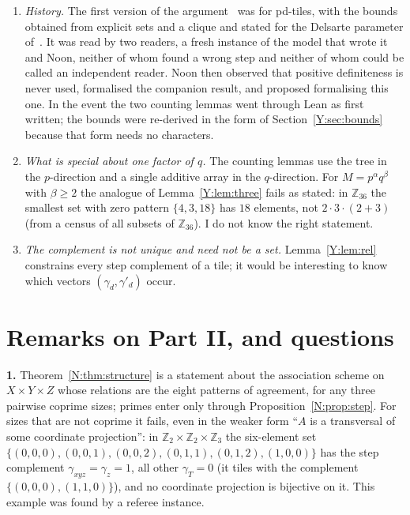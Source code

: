 \documentclass[11pt,a4paper]{amsart}
\theoremstyle{definition}
\theoremstyle{remark}
\newcommand{\Z}{\mathbb{Z}}
\newcommand{\gs}{\gamma}
\newcommand{\gd}{\gamma'}
\begin{document}
\begin{enumerate}
\item \emph{History.} The first version of the argument~\cite{Ynote} was for pd-tiles, with the bounds
obtained from explicit sets and a clique and stated for the Delsarte parameter of~\cite{KLMS}. It was read by
two readers, a fresh instance of the model that wrote it and Noon, neither of whom found a wrong step and
neither of whom could be called an independent reader. Noon then observed that positive definiteness is never used, formalised the
companion result, and proposed formalising this one. In the event the two counting lemmas went through Lean
as first written; the bounds were re-derived in the form of Section~\ref{Y:sec:bounds} because that form needs
no characters.
\item \emph{What is special about one factor of $q$.} The counting lemmas use the tree in the $p$-direction
and a single additive array in the $q$-direction. For $M=p^\alpha q^\beta$ with $\beta\ge2$ the analogue of
Lemma~\ref{Y:lem:three} fails as stated: in $\Z_{36}$ the smallest set with zero pattern $\{4,3,18\}$ has
$18$ elements, not $2\cdot3\cdot(2+3)$ (from a census of all subsets of $\Z_{36}$). I do not know the right
statement.
\item \emph{The complement is not unique and need not be a set.} Lemma~\ref{Y:lem:rel} constrains every step
complement of a tile; it would be interesting to know which vectors $(\gs_d,\gd_d)$ occur.
\end{enumerate}

\section{Remarks on Part II, and questions}

\textbf{1.} Theorem~\ref{N:thm:structure} is a statement about the association scheme on $X\times Y\times Z$ whose
relations are the eight patterns of agreement, for any three pairwise coprime sizes; primes enter only through
Proposition~\ref{N:prop:step}. For sizes that are not coprime it fails, even in the weaker form ``$A$ is a
transversal of some coordinate projection'': in $\Z_2\times\Z_2\times\Z_3$ the six-element set
$\{(0,0,0),(0,0,1),(0,0,2),(0,1,1),(0,1,2),(1,0,0)\}$ has the step complement $\gamma_{xyz}=\gamma_{z}=1$, all
other $\gamma_T=0$ (it tiles with the complement $\{(0,0,0),(1,1,0)\}$), and no coordinate projection is
bijective on it. This example was found by a referee instance.
\end{document}
